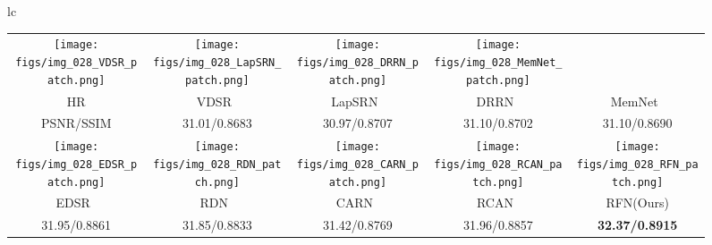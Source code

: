 \documentclass[preprint]{elsarticle}
\begin{document}
\begin{figure*}[htpb]
{\begin{tabular}{lc}
\begin{adjustbox}{valign=t}
\begin{tabular}{ccccc}
				\hspace{-3mm}
				\texttt{[image: figs/img\_028\_VDSR\_patch.png]} &
				\hspace{-3mm}
				\texttt{[image: figs/img\_028\_LapSRN\_patch.png]} & 
				\hspace{-3mm}
				\texttt{[image: figs/img\_028\_DRRN\_patch.png]} &
				\hspace{-3mm}
				\texttt{[image: figs/img\_028\_MemNet\_patch.png]} \\
				HR & VDSR~\cite{VDSR} & LapSRN~\cite{LapSRN} & DRRN~\cite{DRRN} & MemNet~\cite{MemNet} \\
				PSNR/SSIM & 31.01/0.8683 & 30.97/0.8707 & 31.10/0.8702 & 31.10/0.8690 \\
				\texttt{[image: figs/img\_028\_EDSR\_patch.png]} &
				\hspace{-3mm}
				\texttt{[image: figs/img\_028\_RDN\_patch.png]} &
				\hspace{-3mm}
				\texttt{[image: figs/img\_028\_CARN\_patch.png]} &
				\hspace{-3mm}
				\texttt{[image: figs/img\_028\_RCAN\_patch.png]} &
				\hspace{-3mm}
				\texttt{[image: figs/img\_028\_RFN\_patch.png]} \\
				EDSR~\cite{EDSR} &\hspace{-3mm} RDN~\cite{RDN} &\hspace{-3mm} CARN~\cite{CARN} &\hspace{-3mm} RCAN~\cite{RCAN} &\hspace{-3mm} RFN(Ours) \\
				31.95/0.8861 &\hspace{-3mm} 31.85/0.8833 &\hspace{-3mm} 31.42/0.8769 &\hspace{-3mm} 31.96/0.8857 &\hspace{-3mm} \textbf{32.37/0.8915} \\
			\end{tabular}	
		\end{adjustbox}
		\\
		\begin{adjustbox}{valign=t}
			\scriptsize

\end{adjustbox}
\end{tabular}}
\end{figure*}
\end{document}
